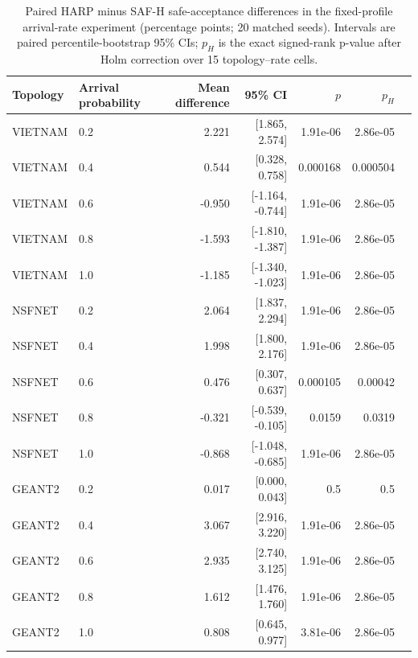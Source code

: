 \documentclass[final,5p]{elsarticle}
\newcommand{\rev}[1]{\textcolor{revisiongreen}{#1}}
\let\newrev\rev
\begin{document}
\begin{table}[p]
\centering
\caption{\newrev{Paired HARP minus SAF-H safe-acceptance differences in the fixed-profile arrival-rate experiment (percentage points; 20 matched seeds). Intervals are paired percentile-bootstrap 95\% CIs; $p_H$ is the exact signed-rank p-value after Holm correction over 15 topology--rate cells.}}
\label{tab:arrival_rate_paired_statistics}
\scriptsize
\begin{tabular}{llrrrrr}
\toprule
Topology & Arrival probability & Mean difference & 95\% CI & $p$ & $p_H$ \\
\midrule
VIETNAM & 0.2 & 2.221 & [1.865, 2.574] & 1.91e-06 & 2.86e-05 \\
VIETNAM & 0.4 & 0.544 & [0.328, 0.758] & 0.000168 & 0.000504 \\
VIETNAM & 0.6 & -0.950 & [-1.164, -0.744] & 1.91e-06 & 2.86e-05 \\
VIETNAM & 0.8 & -1.593 & [-1.810, -1.387] & 1.91e-06 & 2.86e-05 \\
VIETNAM & 1.0 & -1.185 & [-1.340, -1.023] & 1.91e-06 & 2.86e-05 \\
NSFNET & 0.2 & 2.064 & [1.837, 2.294] & 1.91e-06 & 2.86e-05 \\
NSFNET & 0.4 & 1.998 & [1.800, 2.176] & 1.91e-06 & 2.86e-05 \\
NSFNET & 0.6 & 0.476 & [0.307, 0.637] & 0.000105 & 0.00042 \\
NSFNET & 0.8 & -0.321 & [-0.539, -0.105] & 0.0159 & 0.0319 \\
NSFNET & 1.0 & -0.868 & [-1.048, -0.685] & 1.91e-06 & 2.86e-05 \\
GEANT2 & 0.2 & 0.017 & [0.000, 0.043] & 0.5 & 0.5 \\
GEANT2 & 0.4 & 3.067 & [2.916, 3.220] & 1.91e-06 & 2.86e-05 \\
GEANT2 & 0.6 & 2.935 & [2.740, 3.125] & 1.91e-06 & 2.86e-05 \\
GEANT2 & 0.8 & 1.612 & [1.476, 1.760] & 1.91e-06 & 2.86e-05 \\
GEANT2 & 1.0 & 0.808 & [0.645, 0.977] & 3.81e-06 & 2.86e-05 \\

\bottomrule
\end{tabular}
\end{table}
\end{document}
